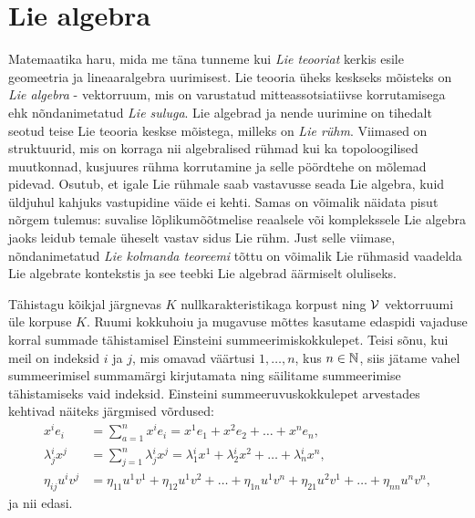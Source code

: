 

\section{Lie algebra}

Matemaatika haru, mida me täna tunneme kui \emph{Lie teooriat} kerkis esile
geomeetria ja lineaaralgebra uurimisest. Lie teooria üheks keskseks mõisteks
on \emph{Lie algebra} - vektorruum, mis on varustatud
mitteassotsiatiivse korrutamisega ehk nõndanimetatud \emph{Lie suluga}.
Lie algebrad ja nende uurimine on tihedalt seotud teise Lie teooria keskse
mõistega, milleks on \emph{Lie rühm}. Viimased on
struktuurid, mis on korraga nii algebralised rühmad kui ka topoloogilised
muutkonnad, kusjuures rühma korrutamine ja selle pöördtehe on mõlemad
pidevad. Osutub, et igale Lie rühmale saab vastavusse seada Lie algebra, kuid
üldjuhul kahjuks vastupidine väide ei kehti. Samas on võimalik näidata
pisut nõrgem tulemus: suvalise lõplikumõõtmelise
reaalsele või komplekssele Lie algebra jaoks leidub temale üheselt
vastav sidus Lie rühm.\cite{kirillov2008introduction} Just selle viimase,
nõndanimetatud \emph{Lie kolmanda teoreemi} tõttu on võimalik
Lie rühmasid vaadelda Lie algebrate kontekstis ja see teebki Lie algebrad
äärmiselt oluliseks.

Tähistagu kõikjal järgnevas $K$ nullkarakteristikaga korpust ning $\mathcal{V}$
vektorruumi üle korpuse $K$. Ruumi kokkuhoiu ja mugavuse mõttes
kasutame edaspidi vajaduse korral summade tähistamisel
Einsteini summeerimiskokkulepet. Teisi sõnu, kui meil on indeksid $i$ ja $j$,
mis omavad väärtusi $1, \dots, n$, kus $n \in \mathbb{N}$, siis jätame vahel
summeerimisel summamärgi kirjutamata ning säilitame summeerimise tähistamiseks
vaid indeksid. Einsteini summeeruvuskokkulepet arvestades kehtivad näiteks
järgmised võrdused:
\begin{align*}
    x^{i} e_{i} &= \sum_{a=1}^{n} x^{i} e_{i} = 
        x^{1} e_{1} + x^{2} e_{2} + \dots + x^{n} e_{n}, \\
    \lambda{^i_j} x^{j} &= \sum_{j=1}^{n} 
        \lambda{^i_j} x^{j} = \lambda{^i_1} x^{1} + 
        \lambda{^i_2} x^{2} + 
        \dots +\lambda{^i_n} x^{n},\\
    \eta_{ij} u^{i} v^{j} &= \eta_{11} u^{1} v^{1} + 
        \eta_{12} u^{1} v^{2} + \dots + \eta_{1n} u^{1} v^{n} + 
        \eta_{21} u^{2} v^{1} + \dots + \eta_{nn} u^{n} v^{n},
\end{align*}
ja nii edasi.

